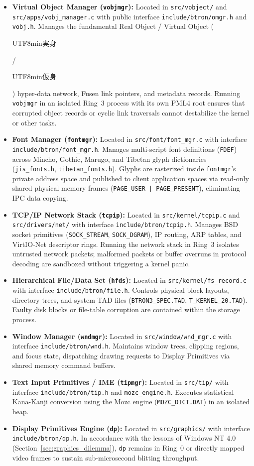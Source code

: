 \documentclass[10pt,journal,compsoc,twocolumn]{article}
\newcommand{\ja}[1]{\begin{CJK*}{UTF8}{min}#1\end{CJK*}}
\begin{document}
\begin{itemize}[leftmargin=*]
    \item \textbf{Virtual Object Manager (\texttt{vobjmgr}):} Located in \texttt{src/vobject/} and \texttt{src/apps/vobj\_manager.c} with public interface \texttt{include/btron/omgr.h} and \texttt{vobj.h}. Manages the fundamental Real Object / Virtual Object (\ja{実身}/\ja{仮身}) hyper-data network, Fusen link pointers, and metadata records. Running \texttt{vobjmgr} in an isolated Ring~3 process with its own PML4 root ensures that corrupted object records or cyclic link traversals cannot destabilize the kernel or other tasks.
    \item \textbf{Font Manager (\texttt{fontmgr}):} Located in \texttt{src/font/font\_mgr.c} with interface \texttt{include/btron/font\_mgr.h}. Manages multi-script font definitions (\texttt{FDEF}) across Mincho, Gothic, Marugo, and Tibetan glyph dictionaries (\texttt{jis\_fonts.h}, \texttt{tibetan\_fonts.h}). Glyphs are rasterized inside \texttt{fontmgr}'s private address space and published to client application spaces via read-only shared physical memory frames (\texttt{PAGE\_USER | PAGE\_PRESENT}), eliminating IPC data copying.
    \item \textbf{TCP/IP Network Stack (\texttt{tcpip}):} Located in \texttt{src/kernel/tcpip.c} and \texttt{src/drivers/net/} with interface \texttt{include/btron/tcpip.h}. Manages BSD socket primitives (\texttt{SOCK\_STREAM}, \texttt{SOCK\_DGRAM}), IP routing, ARP tables, and VirtIO-Net descriptor rings. Running the network stack in Ring~3 isolates untrusted network packets; malformed packets or buffer overruns in protocol decoding are sandboxed without triggering a kernel panic.
    \item \textbf{Hierarchical File/Data Set (\texttt{hfds}):} Located in \texttt{src/kernel/fs\_record.c} with interface \texttt{include/btron/file.h}. Controls physical block layouts, directory trees, and system TAD files (\texttt{BTRON3\_SPEC.TAD}, \texttt{T\_KERNEL\_20.TAD}). Faulty disk blocks or file-table corruption are contained within the storage process.
    \item \textbf{Window Manager (\texttt{wndmgr}):} Located in \texttt{src/window/wnd\_mgr.c} with interface \texttt{include/btron/wnd.h}. Maintains window trees, clipping regions, and focus state, dispatching drawing requests to Display Primitives via shared memory command buffers.
    \item \textbf{Text Input Primitives / IME (\texttt{tipmgr}):} Located in \texttt{src/tip/} with interface \texttt{include/btron/tip.h} and \texttt{mozc\_engine.h}. Executes statistical Kana-Kanji conversion using the Mozc engine (\texttt{MOZC\_DICT.DAT}) in an isolated heap.
    \item \textbf{Display Primitives Engine (\texttt{dp}):} Located in \texttt{src/graphics/} with interface \texttt{include/btron/dp.h}. In accordance with the lessons of Windows NT 4.0 (Section~\ref{sec:graphics_dilemma}), \texttt{dp} remains in Ring~0 or directly mapped video frames to sustain sub-microsecond blitting throughput.
\end{itemize}
\end{document}
